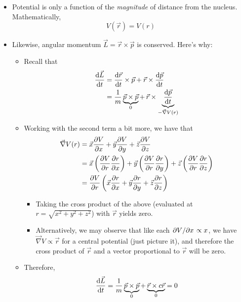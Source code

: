 \documentclass[../notes.tex]{subfiles}
\begin{document}
\begin{itemize}
\begin{itemize}
        \item Potential is only a function of the \emph{magnitude} of distance from the nucleus. Mathematically,
        \begin{equation*}
            V(\vec{r}) = V(r)
        \end{equation*}
        \item Likewise, angular momentum $\vec{L}=\vec{r}\times\vec{p}$ is conserved. Here's why:
        \begin{itemize}
            \item Recall that
            \begin{align*}
                \dv{\vec{L}}{t} &= \dv{\vec{r}}{t}\times\vec{p}+\vec{r}\times\dv{\vec{p}}{t}\\
                &= \frac{1}{m}\underbrace{\vec{p}\times\vec{p}}_0+\,\vec{r}\times\underbrace{\dv{\vec{p}}{t}}_{-\vec{\nabla}V(r)}
            \end{align*}
            \item Working with the second term a bit more, we have that
            \begin{align*}
                \vec{\nabla}V(r) &= \vec{x}\pdv{V}{x}+\vec{y}\pdv{V}{y}+\vec{z}\pdv{V}{z}\\
                &= \vec{x}\left( \pdv{V}{r}\pdv{r}{x} \right)+\vec{y}\left( \pdv{V}{r}\pdv{r}{y} \right)+\vec{z}\left( \pdv{V}{r}\pdv{r}{z} \right)\\
                &= \pdv{V}{r}\left( \vec{x}\pdv{r}{x}+\vec{y}\pdv{r}{y}+\vec{z}\pdv{r}{z} \right)
            \end{align*}
            \begin{itemize}
                \item Taking the cross product of the above (evaluated at $r=\sqrt{x^2+y^2+z^2}$) with $\vec{r}$ yields zero.
                \item Alternatively, we may observe that like each $\pdv*{V}{x}\propto x$, we have $\vec{\nabla}V\propto\vec{r}$ for a central potential (just picture it), and therefore the cross product of $\vec{r}$ and a vector proportional to $\vec{r}$ will be zero.
            \end{itemize}
            \item Therefore,
            \begin{equation*}
                \dv{\vec{L}}{t} = \frac{1}{m}\underbrace{\vec{p}\times\vec{p}}_0+\underbrace{\vec{r}\times c\vec{r}}_0
                = 0
            \end{equation*}

\end{itemize}
\end{itemize}
\end{itemize}
\end{document}
